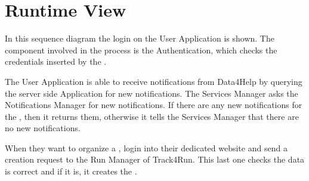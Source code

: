 \documentclass[../../DD.tex]{subfiles}
\begin{document}
\section{Runtime View\label{sect:2.4}}


	In this sequence diagram the  login on the User Application is shown. The component involved in the process is the Authentication, which checks the credentials inserted by the .

	The User Application is able to receive notifications from Data4Help by querying the server side Application for new notifications. The Services Manager asks the Notifications Manager for new notifications. If there are any new notifications for the , then it returns them, otherwise it tells the Services Manager that there are no new notifications.


	




	

	When they want to organize a ,  login into their dedicated website and send a  creation request to the Run Manager of Track4Run. This last one checks the  data is correct and if it is, it creates the .

\end{document}
